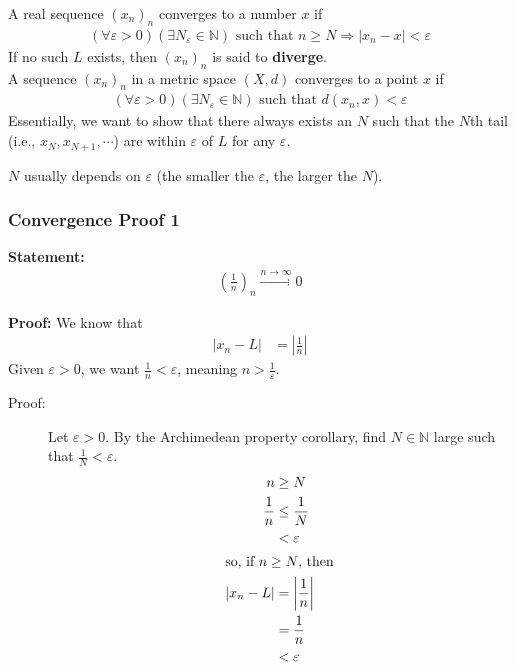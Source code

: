\documentclass[10pt]{extarticle}
\newcommand{\N}{\mathbb{N}}
\begin{document}
      A real sequence $(x_n)_n$ converges to a number $x$ if 
      \begin{align*}
        \left(\forall \varepsilon > 0\right)\left(\exists N_{\varepsilon}\in\N\right) \text{ such that } n\geq N \Rightarrow |x_n-x| < \varepsilon
      \end{align*}
      If no such $L$ exists, then $(x_n)_n$ is said to \textbf{diverge}.\\

      A sequence $(x_n)_n$ in a metric space $(X,d)$ converges to a point $x$ if
      \begin{align*}
        \left(\forall \varepsilon > 0\right)\left(\exists N_{\varepsilon}\in\N\right) \text{ such that } d(x_n,x) < \varepsilon
      \end{align*}
      Essentially, we want to show that there always exists an $N$ such that the $N$th tail (i.e., $x_{N}, x_{N+1},\cdots$) are within $\varepsilon$ of $L$ for any $\varepsilon$.
      \begin{description}
        \small
        \item[Note:] $N$ usually depends on $\varepsilon$ (the smaller the $\varepsilon$, the larger the $N$).
      \end{description}
    \subsubsection{Convergence Proof 1}%
      \textbf{Statement:}
      \begin{align*}
          \left(\frac{1}{n}\right)_{n} \xrightarrow{n\rightarrow\infty} 0
      \end{align*}

      \textbf{Proof:} We know that
      \begin{align*}
        |x_n - L| &= \left|\frac{1}{n}\right|
      \end{align*}
      Given $\varepsilon > 0$, we want $\frac{1}{n} < \varepsilon$, meaning $n > \frac{1}{\varepsilon}$.
      \begin{description}
        \item[Proof:] Let $\varepsilon > 0$. By the Archimedean property corollary, find $N\in\N$ large such that $\frac{1}{N} < \varepsilon$.
          \begin{align*}
            n &\geq N\\
            \frac{1}{n} &\leq \frac{1}{N}\\
                        &< \varepsilon\\
            \shortintertext{so, if $n\geq N$, then}
            |x_n - L| &= \left|\frac{1}{n}\right|\\
                      &= \frac{1}{n}\\
                      &< \varepsilon
          \end{align*}
      \end{description}
\end{document}

